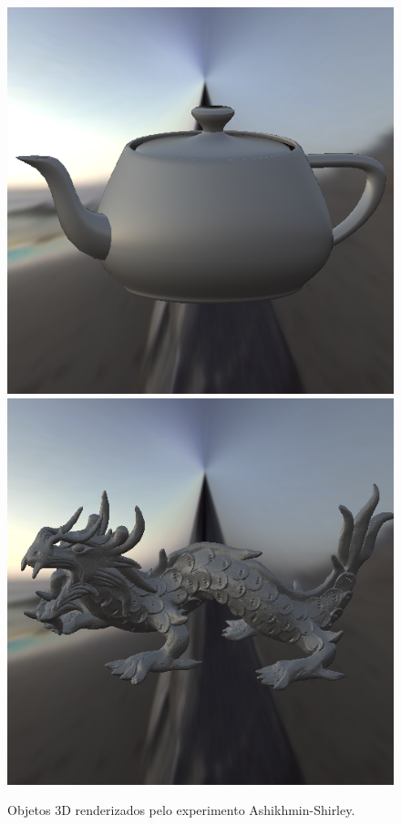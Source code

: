 \begin{figure}[H]
    \caption{\small{Objetos 3D renderizados pelo experimento Ashikhmin-Shirley.}}\label{fig-ashikhmin-shirley-close-to-original-eqlang}
  \includegraphics[width=\linewidth]{./Imagens/brdfs/ashikhmin-shirley-close-to-original-teapot.png}
\endminipage\hfill
{}
  \includegraphics[width=\linewidth]{./Imagens/brdfs/ashikhmin-shirley-close-to-original-dragon.png}

\end{figure}

